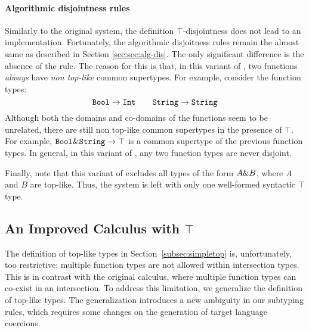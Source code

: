 \paragraph{Algorithmic disjointness rules}

Similarly to the original system, the definition $\top$-disjointness
does not lead to an implementation.  Fortunately, the algorithmic
disjoitness rules remain the almost same as described in Section
\ref{sec:sec:alg-dis}. The only significant difference is the absence
of the  rule. The reason for this is that, in
this variant of \name, two functions \emph{always} have \emph{non top-like} common 
supertypes. For example, consider the function types:
\[ \texttt{Bool} \to \texttt{Int} \qquad \texttt{String} \to \texttt{String} \]
Although both the domains and co-domains of the functions seem 
to be unrelated, there are still non top-like common supertypes in the presence of 
$\top$. For example, $\texttt{Bool}\&\texttt{String} \to \texttt{$\top$}$
is a common supertype of the previous function types. In general, in
this variant of \name, any two function types are never disjoint.

Finally, note that this variant of \name excludes all types of the form
$A \& B$, where $A$  and $B$ are top-like. Thus,
the system is left with only one well-formed syntactic $\top$ type.



\subsection{An Improved Calculus with $\top$}

The definition of top-like types in Section~\ref{subsec:simpletop} is,
unfortunately, too restrictive: multiple function types are not allowed
within intersection types. This is in contrast with the original \name
calculus, where multiple function types can co-exist in an
intersection. To address this limitation, we generalize the definition
of top-like types. The generalization introduces a new ambiguity in
our subtyping rules, which requires some changes on the generation of target
language coercions.

